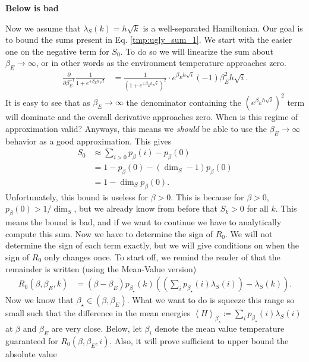 \documentclass{article}
\newcommand{\parens}[1]{\left( #1 \right)}
\newcommand{\anglebrackets}[1]{\left< #1 \right>}
\begin{document}
\begin{center}
\textbf{Below is bad}
\end{center}

Now we assume that $\lambda_S(k) = h \sqrt{k}$ is a well-separated Hamiltonian. Our goal is to bound the sums present in Eq. \eqref{tmp:ugly_sum_1}. We start with the easier one on the negative term for $S_0$. To do so we will linearize the sum about $\beta_E \to \infty$, or in other words as the environment temperature approaches zero. 
\begin{align}
    \frac{\partial}{\partial \beta_E^{-1}} \frac{1}{1 + e^{+ \beta_E h \sqrt{i}}} &= \frac{1}{\parens{1 + e^{+ \beta_E h \sqrt{i}}}^2 } \cdot e^{\beta_E h \sqrt{i}} (-1)\beta_E^2 h \sqrt{i}.
\end{align}
It is easy to see that as $\beta_E \to \infty$ the denominator containing the $\left(e^{\beta_E h \sqrt{i}}\right)^2$ term will dominate and the overall derivative approaches zero. When is this regime of approximation valid?
Anyways, this means we \emph{should} be able to use the $\beta_E \to \infty$ behavior as a good approximation. This gives
\begin{align}
    S_0 &\approx \sum_{i > 0} p_{\beta}(i) - p_{\beta}(0) \\
    &= 1 - p_{\beta}(0) - (\dim_S - 1) p_{\beta}(0) \\
    &= 1 - \dim_S p_{\beta}(0).
\end{align}
Unfortunately, this bound is useless for $\beta > 0$. This is because for $\beta > 0$, $p_{\beta}(0) > 1 / \dim_S$, but we already know from before that $S_k > 0$ for all $k$. This means the bound is bad, and if we want to continue we have to analytically compute this sum.
\newpage
Now we have to determine the sign of $R_0$. We will not determine the sign of each term exactly, but we will give conditions on when the sign of $R_0$ only changes once. To start off, we remind the reader of that the remainder is written (using the Mean-Value version)
\begin{align}
    R_0(\beta, \beta_E, k) &= (\beta - \beta_E) p_{\beta_{\star}}(k) \parens{\parens{\sum_i p_{\beta_{\star}}(i) \lambda_S(i)} - \lambda_S(k)}.
\end{align}
Now we know that $\beta_{\star} \in (\beta, \beta_E)$. What we want to do is squeeze this range so small such that the difference in the mean energies $\anglebrackets{H}_{\beta_{\star}} \coloneqq \sum_i p_{\beta_{\star}}(i) \lambda_S(i)$ at $\beta$ and $\beta_E$ are very close. Below, let $\beta_i$ denote the mean value temperature guaranteed for $R_0(\beta, \beta_E, i)$. Also, it will prove sufficient to upper bound the absolute value
\end{document}
